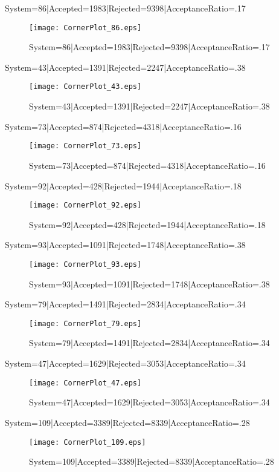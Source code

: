 \documentclass[10pt]{article}
\begin{document}
System=86|Accepted=1983|Rejected=9398|AcceptanceRatio=.17
\begin{figure}[h]
\texttt{[image: CornerPlot\_86.eps]}
\caption{System=86|Accepted=1983|Rejected=9398|AcceptanceRatio=.17}
\label{S86}
\centering
\end{figure}

System=43|Accepted=1391|Rejected=2247|AcceptanceRatio=.38
\begin{figure}[h]
\texttt{[image: CornerPlot\_43.eps]}
\caption{System=43|Accepted=1391|Rejected=2247|AcceptanceRatio=.38}
\label{S43}
\centering
\end{figure}

System=73|Accepted=874|Rejected=4318|AcceptanceRatio=.16
\begin{figure}[h]
\texttt{[image: CornerPlot\_73.eps]}
\caption{System=73|Accepted=874|Rejected=4318|AcceptanceRatio=.16}
\label{S73}
\centering
\end{figure}

System=92|Accepted=428|Rejected=1944|AcceptanceRatio=.18
\begin{figure}[h]
\texttt{[image: CornerPlot\_92.eps]}
\caption{System=92|Accepted=428|Rejected=1944|AcceptanceRatio=.18}
\label{S92}
\centering
\end{figure}

System=93|Accepted=1091|Rejected=1748|AcceptanceRatio=.38
\begin{figure}[h]
\texttt{[image: CornerPlot\_93.eps]}
\caption{System=93|Accepted=1091|Rejected=1748|AcceptanceRatio=.38}
\label{S93}
\centering
\end{figure}

System=79|Accepted=1491|Rejected=2834|AcceptanceRatio=.34
\begin{figure}[h]
\texttt{[image: CornerPlot\_79.eps]}
\caption{System=79|Accepted=1491|Rejected=2834|AcceptanceRatio=.34}
\label{S79}
\centering
\end{figure}

System=47|Accepted=1629|Rejected=3053|AcceptanceRatio=.34
\begin{figure}[h]
\texttt{[image: CornerPlot\_47.eps]}
\caption{System=47|Accepted=1629|Rejected=3053|AcceptanceRatio=.34}
\label{S47}
\centering
\end{figure}

System=109|Accepted=3389|Rejected=8339|AcceptanceRatio=.28
\begin{figure}[h]
\texttt{[image: CornerPlot\_109.eps]}
\caption{System=109|Accepted=3389|Rejected=8339|AcceptanceRatio=.28}
\label{S109}
\centering
\end{figure}
\end{document}
